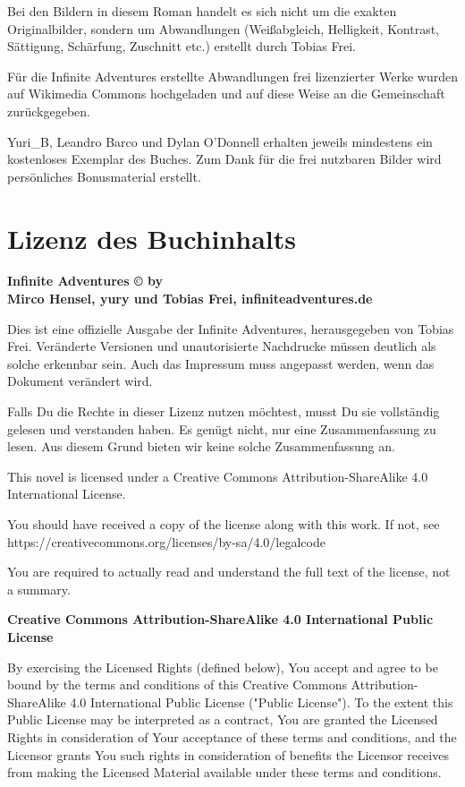 Bei den Bildern in diesem Roman handelt es sich nicht um die exakten Originalbilder, sondern um Abwandlungen (Weißabgleich, Helligkeit, Kontrast, Sättigung, Schärfung, Zuschnitt etc.) erstellt durch Tobias Frei.

Für die Infinite Adventures erstellte Abwandlungen frei lizenzierter Werke wurden auf Wikimedia Commons hochgeladen und auf diese Weise an die Gemeinschaft zurückgegeben.

Yuri\_B, Leandro Barco und Dylan O'Donnell erhalten jeweils mindestens ein kostenloses Exemplar des Buches. Zum Dank für die frei nutzbaren Bilder wird persönliches Bonusmaterial erstellt.


\chapter{Lizenz des Buchinhalts}

\textbf{Infinite Adventures © by\\ Mirco Hensel, yury und Tobias Frei, infiniteadventures.de}

Dies ist eine offizielle Ausgabe der Infinite Adventures, herausgegeben von Tobias Frei. Veränderte Versionen und unautorisierte Nachdrucke müssen deutlich als solche erkennbar sein. Auch das Impressum muss angepasst werden, wenn das Dokument verändert wird.

Falls Du die Rechte in dieser Lizenz nutzen möchtest, musst Du sie vollständig gelesen und verstanden haben. Es genügt nicht, nur eine Zusammenfassung zu lesen. Aus diesem Grund bieten wir keine solche Zusammenfassung an.

This novel is licensed under a Creative Commons Attribution-ShareAlike 4.0 International License.

You should have received a copy of the license along with this work. If not, see\\
https://creativecommons.org/licenses/by-sa/4.0/legalcode

You are required to actually read and understand the full text of the license, not a summary.

\begin{center}
    \large{\textbf{Creative Commons Attribution-ShareAlike 4.0 International Public License}}
\end{center}

By exercising the Licensed Rights (defined below), You accept and agree to be bound by the terms and conditions of this Creative Commons Attribution-ShareAlike 4.0 International Public License ("Public License"). To the extent this Public License may be interpreted as a contract, You are granted the Licensed Rights in consideration of Your acceptance of these terms and conditions, and the Licensor grants You such rights in consideration of benefits the Licensor receives from making the Licensed Material available under these terms and conditions.

